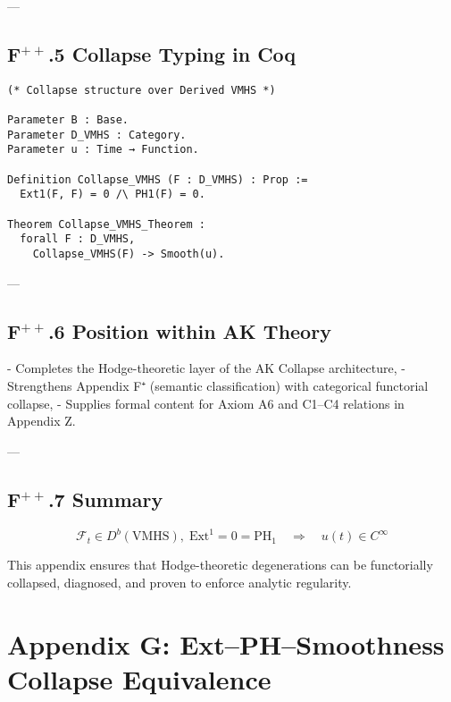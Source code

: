 \documentclass[11pt]{article}
\begin{document}
---

\subsection*{F$^{++}$.5 Collapse Typing in Coq}

\begin{lstlisting}[language=Coq, caption=VMHS Collapse Functor in Type Theory]
(* Collapse structure over Derived VMHS *)

Parameter B : Base.
Parameter D_VMHS : Category.
Parameter u : Time → Function.

Definition Collapse_VMHS (F : D_VMHS) : Prop :=
  Ext1(F, F) = 0 /\ PH1(F) = 0.

Theorem Collapse_VMHS_Theorem :
  forall F : D_VMHS,
    Collapse_VMHS(F) -> Smooth(u).
\end{lstlisting}

---

\subsection*{F$^{++}$.6 Position within AK Theory}

- Completes the Hodge-theoretic layer of the AK Collapse architecture,
- Strengthens Appendix F⁺ (semantic classification) with categorical functorial collapse,
- Supplies formal content for Axiom A6 and C1–C4 relations in Appendix Z.

---

\subsection*{F$^{++}$.7 Summary}

\[
\boxed{
\mathcal{F}_t \in D^b(\mathrm{VMHS}),
\;
\mathrm{Ext}^1 = 0 = \mathrm{PH}_1
\quad \Rightarrow \quad
u(t) \in C^\infty
}
\]

This appendix ensures that Hodge-theoretic degenerations can be functorially collapsed,  
diagnosed, and proven to enforce analytic regularity.






\section*{Appendix G: Ext–PH–Smoothness Collapse Equivalence}
\end{document}
